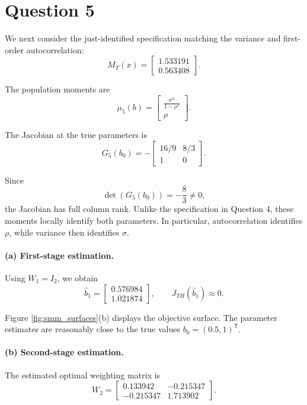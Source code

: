 \documentclass{article}
\begin{document}
\section*{Question 5}

We next consider the just-identified specification matching
the variance and first-order autocorrelation:
\[
    M_T(x)
    =
    \begin{bmatrix}
        1.533191\\
        0.563408
    \end{bmatrix}.
\]

The population moments are
\[
    \mu_5(b)
    =
    \begin{bmatrix}
        \displaystyle\frac{\sigma^2}{1-\rho^2}\\[6pt]
        \rho
    \end{bmatrix}.
\]

The Jacobian at the true parameters is
\[
    G_5(b_0)
    =
    -
    \begin{bmatrix}
        16/9 & 8/3\\
        1 & 0
    \end{bmatrix}.
\]

Since
\[
    \det(G_5(b_0))=-\frac{8}{3}\neq0,
\]
the Jacobian has full column rank. Unlike the specification
in Question 4, these moments locally identify both parameters.
In particular, autocorrelation identifies $\rho$, while
variance then identifies $\sigma$.

\paragraph{(a) First-stage estimation.}

Using $W_1=I_2$, we obtain
\[
    \widehat b_1
    =
    \begin{bmatrix}
        0.576984\\
        1.021874
    \end{bmatrix},
    \qquad
    J_{TH}(\widehat b_1)\approx0.
\]

Figure \ref{fig:smm_surfaces}(b) displays the objective surface.
The parameter estimates are reasonably close to the true values
$b_0=(0.5,1)^{\mathsf T}$.

\paragraph{(b) Second-stage estimation.}

The estimated optimal weighting matrix is
\[
    W_2
    =
    \begin{bmatrix}
        0.133942 & -0.215347\\
        -0.215347 & 1.713902
    \end{bmatrix}.
\]
\end{document}
